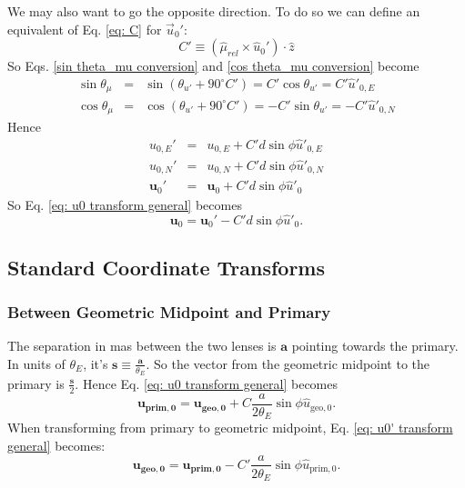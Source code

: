 \documentclass[twocolumn]{aastex701}
\newcommand{\vect}[1]{\boldsymbol{#1}}
\begin{document}
We may also want to go the opposite direction. To do so we can define an equivalent of Eq. \ref{eq: C} for $\vec{u}_0'$:
\begin{equation}
    C' \equiv (\hat{\mu}_{rel} \times \hat{u}_0') \cdot \hat{z}
\end{equation}
So Eqs. \ref{sin theta_mu conversion} and \ref{cos theta_mu conversion} become
\begin{eqnarray}
    \sin\theta_{\mu} &=& \sin(\theta_{u'} + 90^{\circ}C') = C'\cos\theta_{u'} = C'\hat{u}'_{0,E} \\
    \cos\theta_{\mu} &=& \cos(\theta_{u'} + 90^{\circ}C') = -C'\sin\theta_{u'} = -C'\hat{u}'_{0,N}
\end{eqnarray}
Hence
\begin{eqnarray}
    u_{0, E}' &=& u_{0, E} +C'd\sin\phi\hat{u}'_{0,E} \\
    u_{0, N}' &=& u_{0, N} +C'd\sin\phi\hat{u}'_{0,N} \\
    \vect{u}_0' &=& \vect{u}_0 + C'd\sin\phi\hat{u}'_0
\end{eqnarray}
So Eq. \ref{eq: u0 transform general} becomes
\begin{equation}
    \label{eq: u0' transform general}
    \boxed{\vect{u}_0 = \vect{u}_0' - C'd\sin\phi\hat{u}'_0}.
\end{equation}

\subsection{Standard Coordinate Transforms}
\label{sec: standard transforms}
\subsubsection{Between Geometric Midpoint and Primary}
The separation in mas between the two lenses is $\vect{a}$ pointing towards the primary. In units of $\theta_{E}$, it's $\vect{s} \equiv \frac{\vect{a}}{\theta_E}$. So the vector from the geometric midpoint to the primary is $\frac{\vect{s}}{2}$. Hence Eq. \ref{eq: u0 transform general} becomes
\begin{equation}
    \vect{u_{\textrm{prim},0}} = \vect{u_{\textrm{geo}, 0}} + C\frac{a}{2\theta_E}\sin\phi\hat{u}_{\textrm{geo}, 0}.
\end{equation}
When transforming from primary to geometric midpoint, Eq. \ref{eq: u0' transform general} becomes:
\begin{equation}
    \vect{u_{\textrm{geo},0}} = \vect{u_{\textrm{prim},0}} - C'\frac{a}{2\theta_E}\sin\phi\hat{u}_{\textrm{prim}, 0}.
\end{equation}
\end{document}
